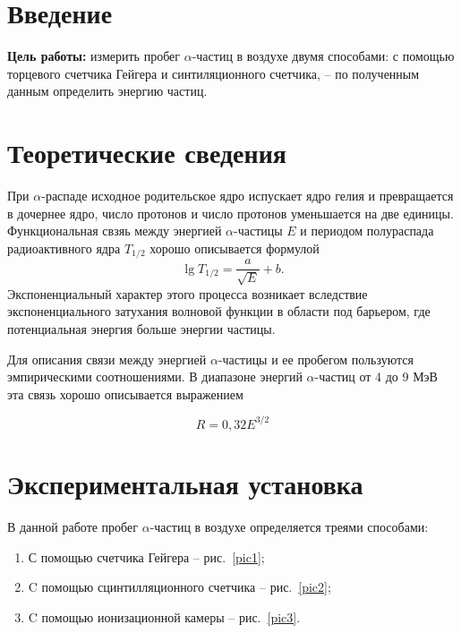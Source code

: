 \documentclass[a4paper,12pt]{article} %
\begin{document}
\section{Введение}

\noindent
\textbf{Цель работы:} измерить пробег $\alpha$-частиц в воздухе двумя способами: с помощью торцевого счетчика Гейгера и синтиляционного счетчика, -- по полученным данным определить энергию частиц.


\medskip

\section{Теоретические сведения}
	При $\alpha$-распаде исходное родительское ядро испускает ядро гелия и превращается в дочернее ядро, число протонов и число протонов уменьшается на две единицы. Функциональная свзяь между энергией $\alpha$-частицы $E$ и периодом полураспада радиоактивного ядра $T_{1/2}$ хорошо описывается формулой
	\begin{equation*}
		 \lg T_{1/2} = \frac{a}{\sqrt{E}} + b.
	\end{equation*}
	Экспоненциальный характер этого процесса возникает вследствие экспоненциального затухания волновой функции в области под барьером, где потенциальная энергия больше энергии частицы.
	
	\medskip

\noindent Для описания связи между энергией $\alpha$-частицы и ее пробегом пользуются эмпирическими соотношениями. В диапазоне энергий $\alpha$-частиц от 4 до 9 МэВ эта связь хорошо описывается выражением

	\begin{equation*}
		\label{eq:R(E)}
		\tag{$\star$}
		R = 0,32E^{3/2}
	\end{equation*}
	

\section{Экспериментальная установка}

	В данной работе пробег $\alpha$-частиц в воздухе определяется треями способами:
	\begin{enumerate}
		\item
			С помощью счетчика Гейгера -- рис.~\ref{pic1};
		\item
			C помощью сцинтилляционного счетчика -- рис.~\ref{pic2};
		\item
			C помощью ионизационной камеры -- рис.~\ref{pic3}.
	\end{enumerate} 
	
\end{document}
